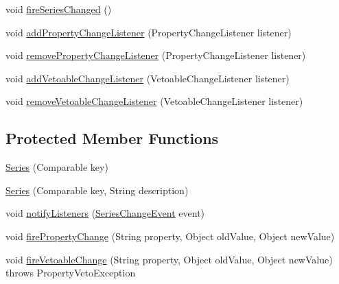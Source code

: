 \begin{DoxyCompactItemize}
\item 
void \mbox{\hyperlink{classorg_1_1jfree_1_1data_1_1general_1_1_series_adf6b3f452e82f6f4b38186e6d691791a}{fire\+Series\+Changed}} ()
\item 
void \mbox{\hyperlink{classorg_1_1jfree_1_1data_1_1general_1_1_series_a4a2d0a038d4efeffebaafbbe4f7874df}{add\+Property\+Change\+Listener}} (Property\+Change\+Listener listener)
\item 
void \mbox{\hyperlink{classorg_1_1jfree_1_1data_1_1general_1_1_series_a6a5826407b91adae3f21b50596450919}{remove\+Property\+Change\+Listener}} (Property\+Change\+Listener listener)
\item 
void \mbox{\hyperlink{classorg_1_1jfree_1_1data_1_1general_1_1_series_ae42a0e1a4aa0f483b202ec772836d5ed}{add\+Vetoable\+Change\+Listener}} (Vetoable\+Change\+Listener listener)
\item 
void \mbox{\hyperlink{classorg_1_1jfree_1_1data_1_1general_1_1_series_aede4a6b692401c0e85e74cdd005236db}{remove\+Vetoable\+Change\+Listener}} (Vetoable\+Change\+Listener listener)
\end{DoxyCompactItemize}
\subsection*{Protected Member Functions}
\begin{DoxyCompactItemize}
\item 
\mbox{\hyperlink{classorg_1_1jfree_1_1data_1_1general_1_1_series_ac6fa61b6422c85047cb83a800f417f25}{Series}} (Comparable key)
\item 
\mbox{\hyperlink{classorg_1_1jfree_1_1data_1_1general_1_1_series_af5897ef93189a672b9dc02e6facfba94}{Series}} (Comparable key, String description)
\item 
void \mbox{\hyperlink{classorg_1_1jfree_1_1data_1_1general_1_1_series_a6c728147cd28460113771d4e69086a62}{notify\+Listeners}} (\mbox{\hyperlink{classorg_1_1jfree_1_1data_1_1general_1_1_series_change_event}{Series\+Change\+Event}} event)
\item 
void \mbox{\hyperlink{classorg_1_1jfree_1_1data_1_1general_1_1_series_a34249552e35b2759b5b349608e6de46b}{fire\+Property\+Change}} (String property, Object old\+Value, Object new\+Value)
\item 
void \mbox{\hyperlink{classorg_1_1jfree_1_1data_1_1general_1_1_series_a6e0e43f7549c40d90ebad83ec99db980}{fire\+Vetoable\+Change}} (String property, Object old\+Value, Object new\+Value)  throws Property\+Veto\+Exception 
\end{DoxyCompactItemize}



